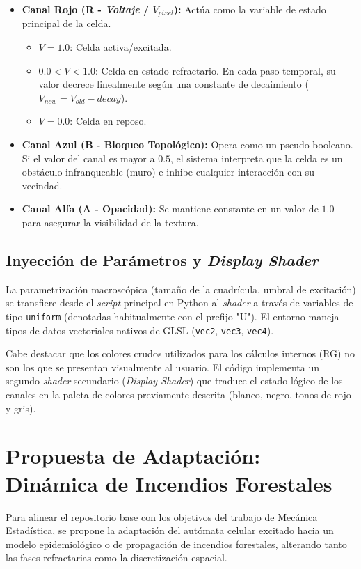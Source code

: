 \documentclass[12pt,a4paper]{article}
\begin{document}
\begin{itemize}
    \item \textbf{Canal Rojo (R - \textit{Voltaje} / $V_{pixel}$):} Actúa como la variable de estado principal de la celda. 
    \begin{itemize}
        \item $V = 1.0$: Celda activa/excitada.
        \item $0.0 < V < 1.0$: Celda en estado refractario. En cada paso temporal, su valor decrece linealmente según una constante de decaimiento ($V_{new} = V_{old} - decay$).
        \item $V = 0.0$: Celda en reposo.
    \end{itemize}
    \item \textbf{Canal Azul (B - Bloqueo Topológico):} Opera como un pseudo-booleano. Si el valor del canal es mayor a $0.5$, el sistema interpreta que la celda es un obstáculo infranqueable (muro) e inhibe cualquier interacción con su vecindad.
    \item \textbf{Canal Alfa (A - Opacidad):} Se mantiene constante en un valor de $1.0$ para asegurar la visibilidad de la textura.
\end{itemize}

\subsection{Inyección de Parámetros y \textit{Display Shader}}
La parametrización macroscópica (tamaño de la cuadrícula, umbral de excitación) se transfiere desde el \textit{script} principal en Python al \textit{shader} a través de variables de tipo \texttt{uniform} (denotadas habitualmente con el prefijo "U"). El entorno maneja tipos de datos vectoriales nativos de GLSL (\texttt{vec2}, \texttt{vec3}, \texttt{vec4}).

Cabe destacar que los colores crudos utilizados para los cálculos internos (RG) no son los que se presentan visualmente al usuario. El código implementa un segundo \textit{shader} secundario (\textit{Display Shader}) que traduce el estado lógico de los canales en la paleta de colores previamente descrita (blanco, negro, tonos de rojo y gris).

\section{Propuesta de Adaptación: Dinámica de Incendios Forestales}

Para alinear el repositorio base con los objetivos del trabajo de Mecánica Estadística, se propone la adaptación del autómata celular excitado hacia un modelo epidemiológico o de propagación de incendios forestales, alterando tanto las fases refractarias como la discretización espacial.
\end{document}
